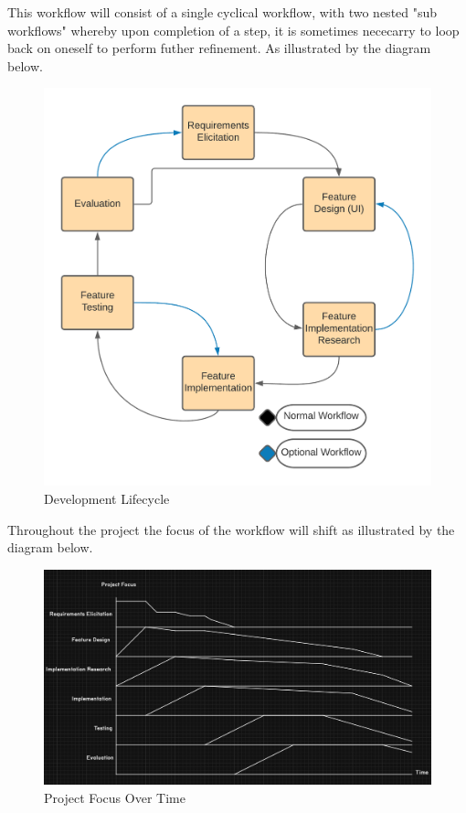 This workflow will consist of a single cyclical workflow, with two nested "sub workflows" whereby upon completion of a step, it is sometimes nececarry to loop back on oneself to perform futher refinement. As illustrated by the diagram below.
\begin{figure}
  \begin{center}
    \includegraphics[scale=0.75]{Images/Project_Management_Methodology}
    \caption{Development Lifecycle}
    \label{fig:development lifecycle}
  \end{center}
\end{figure}
Throughout the project the focus of the workflow will shift as illustrated by the diagram below.

\begin{figure}
  \begin{center}
    \includegraphics[scale=0.4]{Images/ProjectFocus2}
    \caption{Project Focus Over Time}
    \label{fig:project focus}
  \end{center}
\end{figure}
